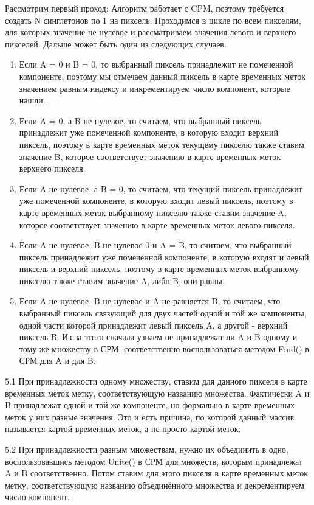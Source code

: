 \documentclass{report}
\begin{document}
			 \par Рассмотрим первый проход:
Алгоритм работает с CPM, поэтому требуется создать N синглетонов по 1 на пиксель. Проходимся в цикле по всем пикселям, для которых значение не нулевое и рассматриваем значения левого и верхнего пикселей. Дальше может быть один из следующих случаев:
\begin{enumerate}
\item Если A = 0 и B = 0, то выбранный пиксель принадлежит не помеченной компоненте, поэтому мы отмечаем данный пиксель в карте временных меток значением равным индексу и инкрементируем число компонент, которые нашли.
\item Если A = 0, а B не нулевое, то считаем, что выбранный пиксель принадлежит уже помеченной компоненте, в которую входит верхний пиксель, поэтому в карте временных меток текущему пикселю также ставим значение B, которое соответствует значению в карте временных меток верхнего пикселя.
\item Если A не нулевое, а B = 0, то считаем, что текущий пиксель принадлежит уже помеченной компоненте, в которую входит левый пиксель, поэтому в карте временных меток выбранному пикселю также ставим значение A, которое соответствует значению в карте временных меток левого пикселя.
\item Если A не нулевое, B не нулевое 0 и A = B, то считаем, что выбранный пиксель принадлежит уже помеченной компоненте, в которую входят и левый пиксель и верхний пиксель, поэтому в карте временных меток выбранному пикселю также ставим значение A, либо B, они равны.
\item  Если A не нулевое, B не нулевое и A не равняется B, то считаем, что выбранный пиксель связующий для двух частей одной и той же компоненты, одной части которой принадлежит левый пиксель A, а другой - верхний пиксель B. Из-за этого сначала узнаем не принадлежат ли A и B одному и тому же множеству в СРМ, соответственно воспользоваться методом Find() в СРМ для A и для B.
\end{enumerate}
					\par5.1 При принадлежности одному множеству, ставим для данного пикселя в карте временных меток метку, соответствующую названию множества. Фактически A и B принадлежат одной и той же компоненте, но формально в карте временных меток у них разные значения. Это и есть причина, по которой данный массив называется картой временных меток, а не просто картой меток.
					\par5.2 При принадлежности разным множествам, нужно их объединить в одно, воспользовавшись методом Unite() в СРМ для множеств, которым принадлежат A и B соответственно. Потом ставим для этого пикселя в карте временных меток метку, соответствующую названию объединённого множества и декрементируем число компонент.
\end{document}
